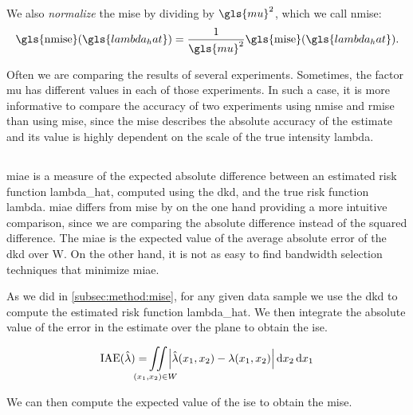 We also \textit{normalize} the \gls{mise} by dividing by $\gls{mu}^2$,
which we call \gls{nmise}:
\begin{equation}
\label{eq:nmise}
    \mbox{\gls{nmise}}(\gls{lambda_hat}) = 
        \frac{1}{\gls{mu}^2} \mbox{\gls{mise}}(\gls{lambda_hat}) \text{.}
\end{equation}

Often we are comparing the results of several experiments.
Sometimes, the \gls{factor} \gls{mu} has different values in each of those experiments.
In such a case, it is more informative to compare the accuracy of two experiments using \gls{nmise} and \gls{rmise} than using \gls{mise},
since the \gls{mise} describes the absolute accuracy of the estimate and its value is highly dependent on the scale of the true intensity \gls{lambda}.

\subsection{\texorpdfstring{}{}}
\label{subsec:method:miae}

\Gls{miae} is a measure of the expected absolute difference between an estimated risk function \gls{lambda_hat},
computed using the \gls{dkd}, and the true risk function \gls{lambda}.
\Gls{miae} differs from \gls{mise} by on the one hand providing a more intuitive comparison,
since we are comparing the absolute difference instead of the squared difference.
The \gls{miae} is the expected value of the average absolute error of the \gls{dkd} over \gls{W}.
On the other hand, it is not as easy to find bandwidth selection techniques that minimize \gls{miae}.

As we did in \autoref{subsec:method:mise}, for any given data sample we use the \gls{dkd} to compute the estimated risk function \gls{lambda_hat}.
We then integrate the absolute value of the error in the estimate over the plane to obtain the \gls{ise}.

\begin{equation}
    \mbox{IAE}(\hat{\lambda}) = 
        \iintW{
            \left| \hat{\lambda}\xvec - \lambda\xvec \right|
        }
\end{equation}

We can then compute the expected value of the \gls{ise} to obtain the \gls{mise}.

